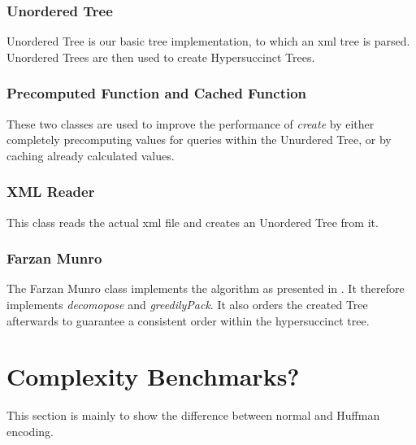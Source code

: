 \documentclass{article}
\begin{document}
\subsubsection{Unordered Tree}
Unordered Tree is our basic tree implementation, to which an xml tree is parsed. Unordered Trees are then used to create Hypersuccinct Trees.
\subsubsection{Precomputed Function and Cached Function}
These two classes are used to improve the performance of \textit{create} by either completely precomputing values for queries within the Unurdered Tree, or by caching already calculated values.
\subsubsection{XML Reader}
This class reads the actual xml file and creates an Unordered Tree from it.
\subsubsection{Farzan Munro}
The Farzan Munro class implements the algorithm as presented in \cite{farzanMunro}. It therefore implements \textit{decomopose} and \textit{greedilyPack}. It also orders the created Tree afterwards to guarantee a consistent order within the hypersuccinct tree.

\section{Complexity Benchmarks?}
This section is mainly to show the difference between normal and Huffman encoding.
\end{document}
